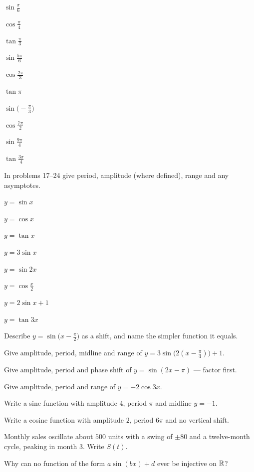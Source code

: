 \begin{problems}[resume]
  \item $\sin\tfrac{\pi}{6}$
  \item $\cos\tfrac{\pi}{4}$
  \item $\tan\tfrac{\pi}{3}$
  \item $\sin\tfrac{5\pi}{6}$
  \item $\cos\tfrac{2\pi}{3}$
  \item $\tan\pi$
  \item $\sin\bigl(-\tfrac{\pi}{3}\bigr)$
  \item $\cos\tfrac{7\pi}{2}$
  \item $\sin\tfrac{9\pi}{4}$
  \item $\tan\tfrac{3\pi}{4}$
\end{problems}

In problems 17--24 give period, amplitude (where defined), range and any
asymptotes.

\begin{problems}[resume]
  \item $y=\sin x$
  \item $y=\cos x$
  \item $y=\tan x$
  \item $y=3\sin x$
  \item $y=\sin 2x$
  \item $y=\cos\tfrac{x}{2}$
  \item $y=2\sin x+1$
  \item $y=\tan 3x$
\end{problems}

\begin{problems}[resume]
  \item Describe $y=\sin\bigl(x-\tfrac{\pi}{2}\bigr)$ as a shift, and name
        the simpler function it equals.
  \item Give amplitude, period, midline and range of
        $y=3\sin\bigl(2(x-\tfrac{\pi}{4})\bigr)+1$.
  \item Give amplitude, period and phase shift of
        $y=\sin(2x-\pi)$ --- factor first.
  \item Give amplitude, period and range of $y=-2\cos 3x$.
  \item Write a sine function with amplitude $4$, period $\pi$ and midline
        $y=-1$.
  \item Write a cosine function with amplitude $2$, period $6\pi$ and no
        vertical shift.
  \item Monthly sales oscillate about $500$ units with a swing of $\pm80$
        and a twelve-month cycle, peaking in month $3$. Write $S(t)$.
  \item Why can no function of the form $a\sin(bx)+d$ ever be injective on
        $\mathbb{R}$?
\end{problems}

